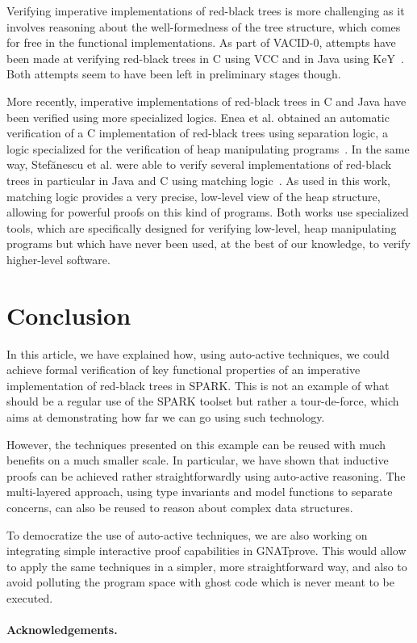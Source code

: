 \documentclass{llncs}
\begin{document}
Verifying imperative implementations of red-black trees is more challenging as it involves reasoning about the well-formedness
of the tree structure, which comes for free in the functional implementations. As part of VACID-0, attempts have been made at
verifying red-black trees in C using VCC and in Java using KeY~\cite{bruns2011specification}.
Both attempts seem to have been left in preliminary stages
though.

More recently, imperative implementations of red-black trees in C and Java have been verified using more specialized logics.
Enea et al. obtained an automatic verification of a C implementation of red-black trees using separation logic, a logic
specialized for the verification of heap manipulating programs~\cite{enea2015automated}. In the
same way, Stef{\u{a}}nescu et al. were able to verify several implementations of red-black trees in particular in Java and
C using matching logic~\cite{stefuanescu2016semantics}. As used in this work, matching logic provides a very precise,
low-level view of the heap structure, allowing for powerful proofs on this kind of programs. Both works use specialized tools,
which are specifically designed for verifying low-level, heap manipulating programs but which have never been used, at the best
of our knowledge, to verify higher-level software.

\section{Conclusion}
In this article, we have explained how, using auto-active techniques, we could achieve formal verification of key functional
properties of an imperative implementation of red-black trees in SPARK. This is not an example of what should be a regular
use of the SPARK toolset but rather a tour-de-force, which aims at demonstrating how far we can go using such technology.

However, the techniques presented on this example can be reused with much benefits on a much smaller scale. In particular, we have shown that
inductive proofs can be achieved rather straightforwardly using auto-active reasoning. The multi-layered approach, using
type invariants and model functions to separate concerns, can also be reused to reason about complex data structures.

To democratize the use of auto-active techniques, we are also working on integrating simple interactive proof capabilities
in GNATprove. This would allow to apply the same techniques in a simpler, more straightforward way, and also to avoid
polluting the program space with ghost code which is never meant to be executed.

\paragraph*{Acknowledgements.}




\end{document}
